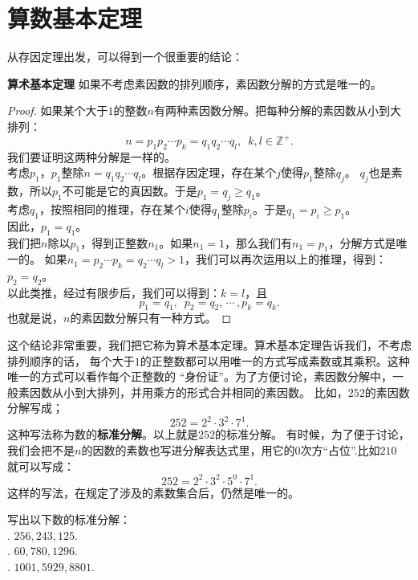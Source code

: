 \documentclass[12pt,UTF8,fontset=none]{ctexbook}
\begin{document}
\section{算数基本定理}
从存因定理出发，可以得到一个很重要的结论：
\begin{tm}{\textbf{算术基本定理}}\label{tm:1-1-0}
    如果不考虑素因数的排列顺序，素因数分解的方式是唯一的。
\end{tm}
\begin{proof}
    如果某个大于$1$的整数$n$有两种素因数分解。把每种分解的素因数从小到大排列：
    $$ n = p_1p_2\cdots p_k = q_1q_2\cdots q_l, \,\,\, k, l \in \mathbb{Z}^+.$$
    我们要证明这两种分解是一样的。\\
    考虑$p_1$，$p_1$整除$n = q_1q_2\cdots q_l$。根据存因定理，存在某个$j$使得$p_1$整除$q_j$。
    $q_j$也是素数，所以$p_1$不可能是它的真因数。于是$p_1 = q_j \geqslant q_1$。\\
    考虑$q_1$，按照相同的推理，存在某个$i$使得$q_1$整除$p_i$。于是$q_1 = p_i \geqslant p_1$。\\
    因此，$p_1 = q_1$。\\
    我们把$n$除以$p_1$，得到正整数$n_1$。如果$n_1 = 1$，那么我们有$n_1 = p_1$，分解方式是唯一的。
    如果$n_1 = p_2\cdots p_k = q_2\cdots q_l > 1$，我们可以再次运用以上的推理，得到：$p_2 = q_2$。\\
    以此类推，经过有限步后，我们可以得到：$k=l$，且
    $$p_1 = q_1, \,\,\, p_2 = q_2, \, \cdots \, , p_k = q_k.$$
    也就是说，$n$的素因数分解只有一种方式。
\end{proof}

这个结论非常重要，我们把它称为算术基本定理。算术基本定理告诉我们，不考虑排列顺序的话，
每个大于$1$的正整数都可以用唯一的方式写成素数或其乘积。这种唯一的方式可以看作每个正整数的
“身份证”。为了方便讨论，素因数分解中，一般素因数从小到大排列，并用乘方的形式合并相同的素因数。
比如，$252$的素因数分解写成；
$$ 252 = 2^2 \cdot 3^2 \cdot 7^1.$$
这种写法称为数的\textbf{标准分解}。以上就是$252$的标准分解。
有时候，为了便于讨论，我们会把不是$n$的因数的素数也写进分解表达式里，用它的$0$次方“占位”.比如$210$
就可以写成：
$$ 252 = 2^2 \cdot 3^2 \cdot 5^0 \cdot 7^1.$$
这样的写法，在规定了涉及的素数集合后，仍然是唯一的。

\begin{xt}\label{xt:1-1-0}
    写出以下数的标准分解：\\
    . $256, 243, 125$.\\
    . $60, 780, 1296$.\\
    . $1001, 5929, 8801$.
\end{xt}
\end{document}
